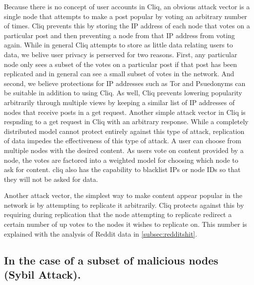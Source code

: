 \documentclass{sig-alternate}
\begin{document}
Because there is no concept of user accounts in Cliq, an obvious attack vector is a single node that attempts to make a post popular by voting an arbitrary number of times. 
Cliq prevents this by storing the IP address of each node that votes on a particular post and then preventing a node from that IP address from voting again. 
While in general Cliq attempts to store as little data relating users to data, we belive user privacy is perserved for two reasons.
First, any particular node only sees a subset of the votes on a particular post if that post has been replicated and in general can see a small subset of votes in the network. 
And second, we believe protections for IP addresses such as Tor and Psuedonyms can be suitable in addition to using Cliq. 
As well, Cliq prevents lowering popularity arbitrarily through multiple views by keeping a similar list of IP addresses of nodes that receive posts in a get request. 
Another simple attack vector in Cliq is respnding to a get request in Cliq with an arbitrary response. 
While a completely distributed model cannot protect entirely against this type of attack, replication of data impedes the effectiveness of this type of attack. A user can choose from multiple nodes with the desired content. As users vote on content provided by a node, the votes are factored into a weighted model for choosing which node to ask for content. cliq also has the capability to blacklist IPs or node IDs so that they will not be asked for data. 
 
Another attack vector, the simplest way to make content appear popular in the network is by attempting to replicate it arbitrarily. 
Cliq protects against this by requiring during replication that the node attempting to replicate redirect a certain number of up votes to the nodes it wishes to replicate on. 
This number is explained with the analysis of Reddit data in \ref{subsec:redditshit}. 


\subsection{In the case of a subset of malicious nodes (Sybil Attack).}
\label{subsec:spammulti}
\end{document}
